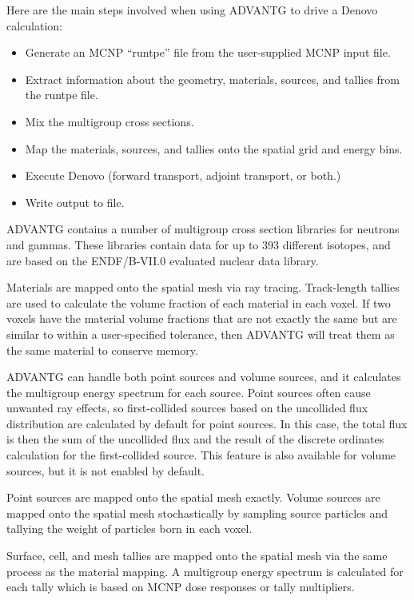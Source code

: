Here are the main steps involved when using ADVANTG to drive a Denovo calculation:
\begin{itemize}
  \item Generate an MCNP ``runtpe'' file from the user-supplied MCNP input file.
  \item Extract information about the geometry, materials, sources, and tallies from the runtpe file.
  \item Mix the multigroup cross sections.
  \item Map the materials, sources, and tallies onto the spatial grid and energy bins.
  \item Execute Denovo (forward transport, adjoint transport, or both.)
  \item Write output to file.
\end{itemize}

ADVANTG contains a number of multigroup cross section libraries for neutrons and gammas.
These libraries contain data for up to 393 different isotopes, and are based on the ENDF/B-VII.0 \cite{endfb7.0} evaluated nuclear data library.

Materials are mapped onto the spatial mesh via ray tracing.
Track-length tallies are used to calculate the volume fraction of each material in each voxel.
If two voxels have the material volume fractions that are not exactly the same but are similar to within a user-specified tolerance, then ADVANTG will treat them as the same material to conserve memory.

ADVANTG can handle both point sources and volume sources, and it calculates the multigroup energy spectrum for each source.
Point sources often cause unwanted ray effects, so first-collided sources based on the uncollided flux distribution are calculated by default for point sources.
In this case, the total flux is then the sum of the uncollided flux and the result of the discrete ordinates calculation for the first-collided source.
This feature is also available for volume sources, but it is not enabled by default.

Point sources are mapped onto the spatial mesh exactly.
Volume sources are mapped onto the spatial mesh stochastically by sampling source particles and tallying the weight of particles born in each voxel.

Surface, cell, and mesh tallies are mapped onto the spatial mesh via the same process as the material mapping. A multigroup energy spectrum is calculated for each tally which is based on MCNP dose responses or tally multipliers.

